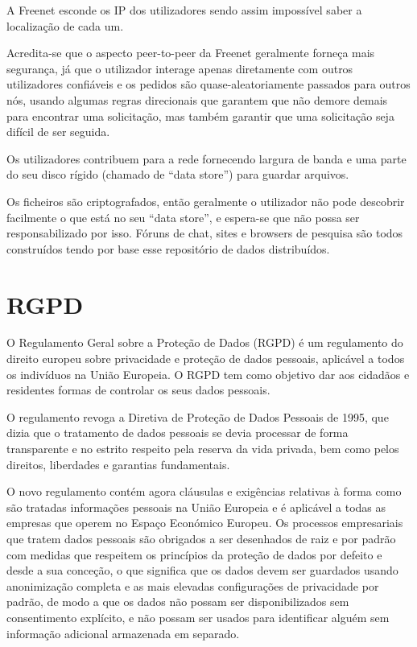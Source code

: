 \documentclass{llncs}
\begin{document}
	A Freenet esconde os IP dos utilizadores sendo assim impossível saber a localização de cada um. \cite{freenetbook}

Acredita-se que o aspecto peer-to-peer da Freenet geralmente forneça mais segurança, já que o utilizador interage apenas diretamente com outros utilizadores confiáveis e os pedidos são quase-aleatoriamente passados para outros nós, usando algumas regras direcionais que garantem que não demore demais para encontrar uma solicitação, mas também garantir que uma solicitação seja difícil de ser seguida.

Os utilizadores contribuem para a rede fornecendo largura de banda e uma parte do seu disco rígido (chamado de “data store”) para guardar arquivos.

Os ficheiros são criptografados, então geralmente o utilizador não pode descobrir facilmente o que está no seu “data store”, e espera-se que não possa ser responsabilizado por isso. Fóruns de chat, sites e browsers de pesquisa são todos construídos tendo por base esse repositório de dados distribuídos. \cite{freenetweb}

\section{RGPD}
O Regulamento Geral sobre a Proteção de Dados (RGPD) é um regulamento do direito europeu sobre privacidade e proteção de dados pessoais, aplicável a todos os indivíduos na União Europeia. O RGPD tem como objetivo dar aos cidadãos e residentes formas de controlar os seus dados pessoais.

O regulamento revoga a Diretiva de Proteção de Dados Pessoais de 1995, que dizia que o tratamento de dados pessoais se devia processar de forma transparente e no estrito respeito pela reserva da vida privada, bem como pelos direitos, liberdades e garantias fundamentais. \cite{cnpd} 

O novo regulamento contém agora cláusulas e exigências relativas à forma como são tratadas informações pessoais na União Europeia e é aplicável a todas as empresas que operem no Espaço Económico Europeu. Os processos empresariais que tratem dados pessoais são obrigados a ser desenhados de raiz e por padrão com medidas que respeitem os princípios da proteção de dados por defeito e desde a sua conceção, o que significa que os dados devem ser guardados usando anonimização completa e as mais elevadas configurações de privacidade por padrão, de modo a que os dados não possam ser disponibilizados sem consentimento explícito, e não possam ser usados para identificar alguém sem informação adicional armazenada em separado. 
\end{document}

